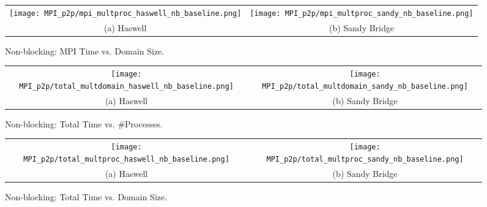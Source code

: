 \begin{enumerate}
	\begin{figure}[p] %
		\begin{tabular}{cc}
			\hspace*{-0.35\linewidth}\texttt{[image: MPI\_p2p/mpi\_multproc\_haswell\_nb\_baseline.png]} & \hspace*{-0.05\linewidth}\texttt{[image: MPI\_p2p/mpi\_multproc\_sandy\_nb\_baseline.png]} \\
			\hspace*{-0.45\linewidth}(a) Haswell & \hspace*{-0.15\linewidth}(b) Sandy Bridge\\[6pt]
		\end{tabular}
		\caption{Non-blocking: MPI Time vs. Domain Size.}
		\label{fig:mpi_multproc_nb_baseline}
	\end{figure}
	
	\begin{figure}[p] %
		\begin{tabular}{cc}
			\hspace*{-0.35\linewidth}\texttt{[image: MPI\_p2p/total\_multdomain\_haswell\_nb\_baseline.png]} & \hspace*{-0.05\linewidth}\texttt{[image: MPI\_p2p/total\_multdomain\_sandy\_nb\_baseline.png]} \\
			\hspace*{-0.45\linewidth}(a) Haswell & \hspace*{-0.15\linewidth}(b) Sandy Bridge\\[6pt]
		\end{tabular}
		\caption{Non-blocking: Total Time vs. \#Processes.}
		\label{fig:total_multdomain_nb_baseline}
	\end{figure}
	
	\begin{figure}[p] %
		\begin{tabular}{cc}
			\hspace*{-0.35\linewidth}\texttt{[image: MPI\_p2p/total\_multproc\_haswell\_nb\_baseline.png]} & \hspace*{-0.05\linewidth}\texttt{[image: MPI\_p2p/total\_multproc\_sandy\_nb\_baseline.png]} \\
			\hspace*{-0.45\linewidth}(a) Haswell & \hspace*{-0.15\linewidth}(b) Sandy Bridge\\[6pt]
		\end{tabular}
		\caption{Non-blocking: Total Time vs. Domain Size.}
		\label{fig:total_multproc_nb_baseline}
	\end{figure}

\end{enumerate}

